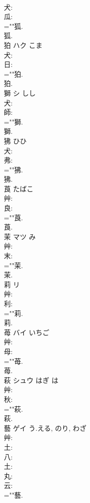 \documentclass[8pt]{extreport}
\begin{document}
\begin{CJK}{UTF8}{min}
\\	犬: 
\\	瓜: 
\\	=""狐.
\\	狐.
\\	狛	ハク	こま		
\\	犬: 
\\	日: 
\\	=""狛.
\\	狛.
\\	獅	シ	しし		
\\	犬: 
\\	師: 
\\	=""獅.
\\	獅.
\\	狒		ひひ				
\\	犬: 
\\	弗: 
\\	=""狒.
\\	狒.
\\	莨		たばこ				
\\	艸: 
\\	良: 
\\	=""莨.
\\	莨.
\\	茉	マツ		み	
\\	艸: 
\\	末: 
\\	=""茉.
\\	茉.
\\	莉	リ			
\\	艸: 
\\	利: 
\\	=""莉.
\\	莉.
\\	苺	バイ	いちご		
\\	艸: 
\\	母: 
\\	=""苺.
\\	苺.
\\	萩	シュウ	はぎ	は	
\\	艸: 
\\	秋: 
\\	=""萩.
\\	萩.
\\	藝	ゲイ	う.える, のり, わざ		
\\	艸: 
\\	土: 
\\	八: 
\\	土: 
\\	丸: 
\\	云: 
\\	=""藝.

\end{CJK}
\end{document}
